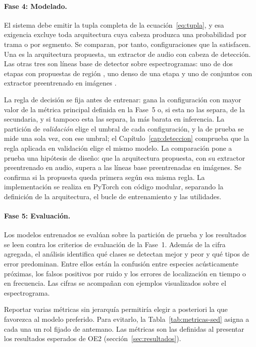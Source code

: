 \paragraph{Fase 4: Modelado.}
\label{sec:fase4}
El sistema debe emitir la tupla completa de la ecuación~\eqref{eq:tupla}, y esa
exigencia excluye toda arquitectura cuya cabeza produzca una probabilidad por
trama o por segmento. Se comparan, por tanto, configuraciones que la satisfacen.
Una es la arquitectura propuesta, un extractor de audio con cabeza de detección.
Las otras tres son líneas base de detector sobre espectrogramas: uno de dos etapas
con propuestas de región \citep{ren_faster_2017}, uno denso de una etapa
\citep{gonzalez_yolo-based_2025} y uno de conjuntos con extractor preentrenado en
imágenes \citep{zhao_rtdetr_2024}.

La regla de decisión se fija antes de entrenar: gana la configuración con mayor
valor de la métrica principal definida en la Fase~5 o, si esta no las separa, de
la secundaria, y si tampoco esta las separa, la más barata en inferencia. La
partición de \emph{validación} elige el umbral de cada configuración, y la de
prueba se mide una sola vez, con ese umbral; el Capítulo~\ref{cap:deteccion}
comprueba que la regla aplicada en validación elige el mismo modelo. La
comparación pone a prueba una hipótesis de diseño: que la arquitectura propuesta,
con su extractor preentrenado en audio, supera a las líneas base preentrenadas en
imágenes. Se confirma si la propuesta queda primera según esa misma regla. La implementación
se realiza en PyTorch con código modular, separando la definición de la
arquitectura, el bucle de entrenamiento y las utilidades.

\paragraph{Fase 5: Evaluación.}
\label{sec:metricas}
Los modelos entrenados se evalúan sobre la partición de prueba y los resultados
se leen contra los criterios de evaluación de la Fase~1. Además de la cifra
agregada, el análisis identifica qué clases se detectan mejor y peor y qué tipos de
error predominan. Entre ellos están la confusión entre especies acústicamente
próximas, los falsos positivos por ruido y los errores de localización en tiempo o
en frecuencia. Las cifras se acompañan con ejemplos visualizados sobre el
espectrograma.

Reportar varias métricas sin jerarquía permitiría elegir a posteriori la que
favorezca al modelo preferido. Para evitarlo, la Tabla~\ref{tab:metricas-sed}
asigna a cada una un rol fijado de antemano. Las métricas son las definidas al
presentar los resultados esperados de OE2 (sección~\ref{sec:resultados}).

